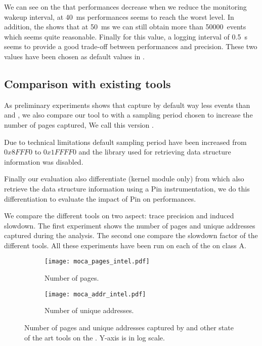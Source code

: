 We can see on the  that performances decrease when we
reduce the monitoring wakeup interval, at \SI{40}{ms}
performances seems to reach the worst level. In addition, the
 shows that at \SI{50}{ms} we can still obtain more than
\SI{50000}{events} which seems quite reasonable. Finally for this value, a logging
interval of \SI{0.5}{s} seems to provide a good trade-off  between
performances and precision.
These two values have been chosen as default values in \Moca.



\subsection{Comparison with existing tools}
\label{sec:expe-ovh}

As preliminary experiments shows that \Mitos capture by
default way less events than \TABARNAC and \Moca, we also compare our tool to
\Mitos with a sampling period chosen to increase the number of pages
captured, We call this version \MitosTun.

Due to technical limitations \MemProf default sampling period have been
increased from  $0x8FFF0$ to $0x1FFFF0$ and the library used for retrieving
data structure information was disabled.

Finally our evaluation also differentiate \Moca (kernel module only) from
\MocaPin which also retrieve the data structure information using a Pin
instrumentation, we do this differentiation to evaluate the impact of Pin on
\Moca performances.

We compare the different tools on two aspect: trace
precision and induced slowdown. The first experiment shows the number of pages
and unique addresses captured during the analysis. The second one compare the
slowdown factor of the different tools.
All these experiments have been run on each of the \NPB on class A.

\begin{figure}[htb]
    \centering
    \begin{subfigure}{\linewidth}
        \texttt{[image: moca\_pages\_intel.pdf]}
        \caption{Number of pages.}
        \label{fig:pages}
    \end{subfigure}
    \begin{subfigure}{\linewidth}
        \texttt{[image: moca\_addr\_intel.pdf]}
        \caption{Number of unique addresses.}
        \label{fig:addr}
    \end{subfigure}
    \caption{Number of pages and unique addresses captured by \Moca and other
        state of the art tools
    on the \NPB. Y-axis is in log scale.}
    \label{fig:pages-addr}
\end{figure}

